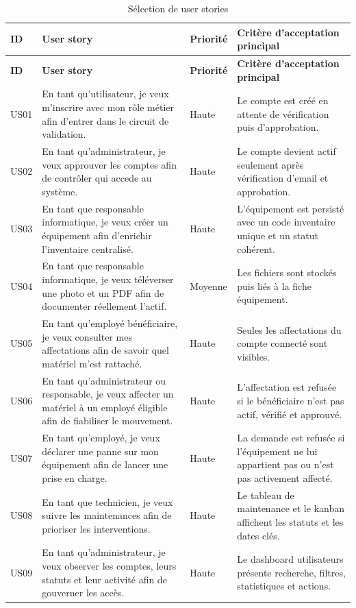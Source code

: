 \begin{longtable}{p{1.5cm}p{4.8cm}p{3cm}p{5.1cm}}
\caption{Sélection de user stories}\\
\toprule
\textbf{ID} & \textbf{User story} & \textbf{Priorité} & \textbf{Critère d'acceptation principal} \\
\midrule
\endfirsthead
\toprule
\textbf{ID} & \textbf{User story} & \textbf{Priorité} & \textbf{Critère d'acceptation principal} \\
\midrule
\endhead
US01 & En tant qu'utilisateur, je veux m'inscrire avec mon rôle métier afin d'entrer dans le circuit de validation. & Haute & Le compte est créé en attente de vérification puis d'approbation. \\
US02 & En tant qu'administrateur, je veux approuver les comptes afin de contrôler qui accede au système. & Haute & Le compte devient actif seulement après vérification d'email et approbation. \\
US03 & En tant que responsable informatique, je veux créer un équipement afin d'enrichir l'inventaire centralisé. & Haute & L'équipement est persisté avec un code inventaire unique et un statut cohérent. \\
US04 & En tant que responsable informatique, je veux téléverser une photo et un PDF afin de documenter réellement l'actif. & Moyenne & Les fichiers sont stockés puis liés à la fiche équipement. \\
US05 & En tant qu'employé bénéficiaire, je veux consulter mes affectations afin de savoir quel matériel m'est rattaché. & Haute & Seules les affectations du compte connecté sont visibles. \\
US06 & En tant qu'administrateur ou responsable, je veux affecter un matériel à un employé éligible afin de fiabiliser le mouvement. & Haute & L'affectation est refusée si le bénéficiaire n'est pas actif, vérifié et approuvé. \\
US07 & En tant qu'employé, je veux déclarer une panne sur mon équipement afin de lancer une prise en charge. & Haute & La demande est refusée si l'équipement ne lui appartient pas ou n'est pas activement affecté. \\
US08 & En tant que technicien, je veux suivre les maintenances afin de prioriser les interventions. & Haute & Le tableau de maintenance et le kanban affichent les statuts et les dates clés. \\
US09 & En tant qu'administrateur, je veux observer les comptes, leurs statuts et leur activité afin de gouverner les accès. & Haute & Le dashboard utilisateurs présente recherche, filtres, statistiques et actions. \\

\end{longtable}
